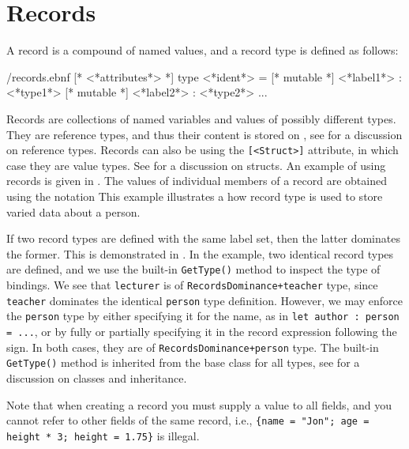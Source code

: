 \documentclass[fsharpnotes.tex]{subfiles}
\begin{document}
\section{Records}
\label{sec:records}
A record is a compound of named values, and a record type is defined as follows:
%
\begin{verbatimwrite}{\ebnf/records.ebnf}
[* <*attributes*> *] 
type <*ident*> = {
  [* mutable *] <*label1*> : <*type1*>
  [* mutable *] <*label2*> : <*type2*>
  ...
}
\end{verbatimwrite}
%
Records are collections of named variables and values of possibly different types. They are reference types, and thus their content is stored on , see  for a discussion on reference types. Records can also be  using the \lstinline{[<Struct>]} attribute, in which case they are value types. See  for a discussion on structs. An example of using records is given in . The values of individual members of a record are obtained using the  notation
%
%
This example illustrates a how record type is used to store varied data about a person.

If two record types are defined with the same label set, then the latter dominates the former. This is demonstrated in .
%
%
In the example, two identical record types are defined, and we use the built-in \lstinline{GetType()} method to inspect the type of bindings. We see that \lstinline{lecturer} is of \lstinline{RecordsDominance+teacher} type, since \lstinline{teacher} dominates the identical \lstinline{person} type definition. However, we may enforce the \lstinline{person} type by either specifying it for the name, as in \lstinline{let author : person = ...}, or by fully or partially specifying it in the record expression following the \lexeme{=} sign. In both cases, they are of \lstinline{RecordsDominance+person} type. The built-in \lstinline{GetType()} method is inherited from the base class for all types, see  for a discussion on classes and inheritance.

Note that when creating a record you must supply a value to all fields, and you cannot refer to other fields of the same record, i.e., \lstinline!{name = "Jon"; age = height * 3; height = 1.75}! is illegal.
\end{document}
